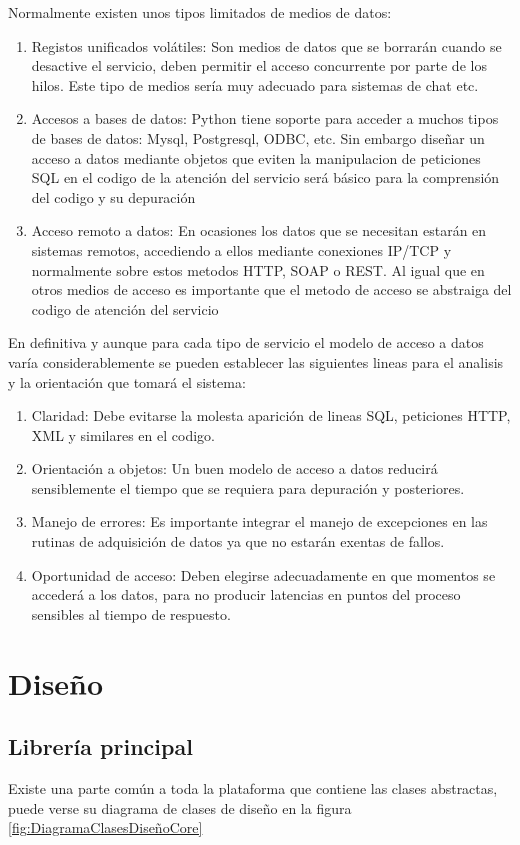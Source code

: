 \documentclass[a4paper,spanish,12pt]{book}
\begin{document}
Normalmente existen unos tipos limitados de medios de datos:
\begin{enumerate}
	\item{Registos unificados volátiles: Son medios de datos que se borrarán cuando se desactive el servicio, deben permitir el acceso concurrente por parte de los hilos. Este tipo de medios sería muy adecuado para sistemas de chat etc.}
	\item{Accesos a bases de datos: Python tiene soporte para acceder a muchos tipos de bases de datos: Mysql, Postgresql, ODBC, etc. Sin embargo diseñar un acceso a datos mediante objetos que eviten la manipulacion de peticiones SQL en el codigo de la atención del servicio será básico para la comprensión del codigo y su depuración}
	\item{Acceso remoto a datos: En ocasiones los datos que se necesitan estarán en sistemas remotos, accediendo a ellos mediante conexiones IP/TCP y normalmente sobre estos metodos HTTP, SOAP o REST. Al igual que en otros medios de acceso es importante que el metodo de acceso se abstraiga del codigo de atención del servicio}
\end{enumerate}
En definitiva y aunque para cada tipo de servicio el modelo de acceso a datos varía considerablemente se pueden establecer las siguientes lineas para el analisis y la orientación que tomará el sistema:
\begin{enumerate}
	\item{Claridad: Debe evitarse la molesta aparición de lineas SQL, peticiones HTTP, XML y similares en el codigo.}
	\item{Orientación a objetos: Un buen modelo de acceso a datos reducirá sensiblemente el tiempo que se requiera para depuración y posteriores.}
	\item{Manejo de errores: Es importante integrar el manejo de excepciones en las rutinas de adquisición de datos ya que no estarán exentas de fallos.}
	\item{Oportunidad de acceso: Deben elegirse adecuadamente en que momentos se accederá a los datos, para no producir latencias en puntos del proceso sensibles al tiempo de respuesto.}
\end{enumerate}

\section{Diseño}

\subsection{Librería principal}
Existe una parte común a toda la plataforma que contiene las clases abstractas, puede verse su diagrama de clases de diseño en la figura \ref{fig:DiagramaClasesDiseñoCore}
\end{document}
